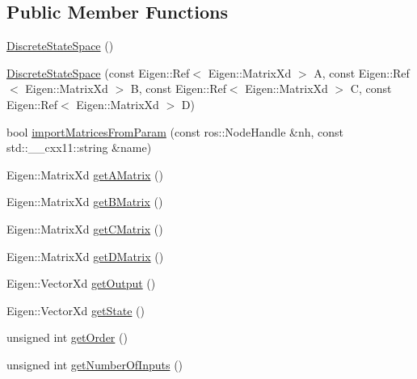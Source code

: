 \subsection*{Public Member Functions}
\begin{DoxyCompactItemize}
\item 
\hyperlink{classeigen__control__toolbox_1_1_discrete_state_space_a205064d804989e5d6d00af4d54386b66}{Discrete\+State\+Space} ()
\item 
\hyperlink{classeigen__control__toolbox_1_1_discrete_state_space_a67e56fac91f99ded7bd5f252a4a4c241}{Discrete\+State\+Space} (const Eigen\+::\+Ref$<$ Eigen\+::\+Matrix\+Xd $>$ A, const Eigen\+::\+Ref$<$ Eigen\+::\+Matrix\+Xd $>$ B, const Eigen\+::\+Ref$<$ Eigen\+::\+Matrix\+Xd $>$ C, const Eigen\+::\+Ref$<$ Eigen\+::\+Matrix\+Xd $>$ D)
\item 
bool \hyperlink{classeigen__control__toolbox_1_1_discrete_state_space_aa6c1fd6786d35dc12b2c4add8799b9e3}{import\+Matrices\+From\+Param} (const ros\+::\+Node\+Handle \&nh, const std\+::\+\_\+\+\_\+cxx11\+::string \&name)
\item 
Eigen\+::\+Matrix\+Xd \hyperlink{classeigen__control__toolbox_1_1_discrete_state_space_af98f9769460769dd5e40328769deb0d1}{get\+A\+Matrix} ()
\item 
Eigen\+::\+Matrix\+Xd \hyperlink{classeigen__control__toolbox_1_1_discrete_state_space_a0031698ccb43b578ebf7357d8ddeef9d}{get\+B\+Matrix} ()
\item 
Eigen\+::\+Matrix\+Xd \hyperlink{classeigen__control__toolbox_1_1_discrete_state_space_a302df76daf30ffa0f3740292155a67d9}{get\+C\+Matrix} ()
\item 
Eigen\+::\+Matrix\+Xd \hyperlink{classeigen__control__toolbox_1_1_discrete_state_space_a760410cc7727d002aa5fa09493e73d84}{get\+D\+Matrix} ()
\item 
Eigen\+::\+Vector\+Xd \hyperlink{classeigen__control__toolbox_1_1_discrete_state_space_a5f558aad3c0df6f779ee9f29a2f0f5c7}{get\+Output} ()
\item 
Eigen\+::\+Vector\+Xd \hyperlink{classeigen__control__toolbox_1_1_discrete_state_space_a48aa4afa8467bc719cfec7b350e555a5}{get\+State} ()
\item 
unsigned int \hyperlink{classeigen__control__toolbox_1_1_discrete_state_space_af2cf915334b74c04f3eae9405c34d0a9}{get\+Order} ()
\item 
unsigned int \hyperlink{classeigen__control__toolbox_1_1_discrete_state_space_a449fa9b037f7de46c84eb9a3248074c8}{get\+Number\+Of\+Inputs} ()
\item 

\end{DoxyCompactItemize}
